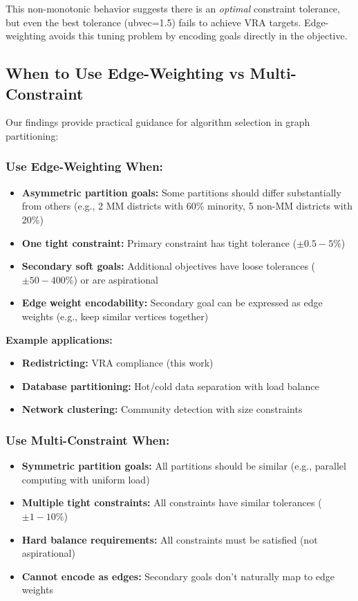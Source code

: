 This non-monotonic behavior suggests there is an \textit{optimal} constraint tolerance, but even the best tolerance (ubvec=1.5) fails to achieve VRA targets. Edge-weighting avoids this tuning problem by encoding goals directly in the objective.

\subsection{When to Use Edge-Weighting vs Multi-Constraint}

Our findings provide practical guidance for algorithm selection in graph partitioning:

\subsubsection{Use Edge-Weighting When:}

\begin{itemize}
    \item \textbf{Asymmetric partition goals:} Some partitions should differ substantially from others (e.g., 2 MM districts with 60\% minority, 5 non-MM districts with 20\%)
    \item \textbf{One tight constraint:} Primary constraint has tight tolerance ($\pm0.5-5\%$)
    \item \textbf{Secondary soft goals:} Additional objectives have loose tolerances ($\pm50-400\%$) or are aspirational
    \item \textbf{Edge weight encodability:} Secondary goal can be expressed as edge weights (e.g., keep similar vertices together)
\end{itemize}

\textbf{Example applications:}
\begin{itemize}
    \item \textbf{Redistricting:} VRA compliance (this work)
    \item \textbf{Database partitioning:} Hot/cold data separation with load balance
    \item \textbf{Network clustering:} Community detection with size constraints
\end{itemize}

\subsubsection{Use Multi-Constraint When:}

\begin{itemize}
    \item \textbf{Symmetric partition goals:} All partitions should be similar (e.g., parallel computing with uniform load)
    \item \textbf{Multiple tight constraints:} All constraints have similar tolerances ($\pm1-10\%$)
    \item \textbf{Hard balance requirements:} All constraints must be satisfied (not aspirational)
    \item \textbf{Cannot encode as edges:} Secondary goals don't naturally map to edge weights
\end{itemize}

